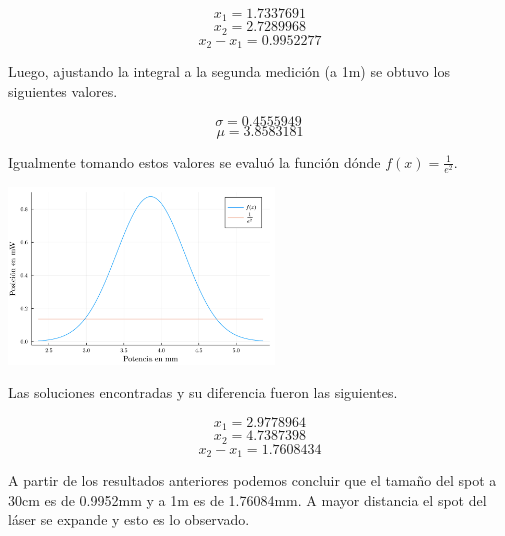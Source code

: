 \documentclass[twocolumn]{article}
\begin{document}
		$$
		x_1=1.7337691
		$$
		$$
		x_2=2.7289968
		$$
		$$
		x_2 - x_1 = 0.9952277
		$$

		Luego, ajustando la integral a la segunda medición (a 1m) se obtuvo los siguientes valores.

		$$
		\sigma = 0.4555949 \
		$$
		$$
		\mu = 3.8583181
		$$

		Igualmente tomando estos valores se evaluó la función dónde $f(x) = \frac{1}{e^2}$.

		\begin{center}
			\includegraphics[width=200pt]{img/normal_2.pdf}
		\end{center}

		Las soluciones encontradas y su diferencia fueron las siguientes.

		$$
		x_1=2.9778964
		$$
		$$
		x_2=4.7387398
		$$
		$$
		x_2 - x_1 = 1.7608434
		$$

		A partir de los resultados anteriores podemos concluir que el tamaño del spot a 30cm es de 0.9952mm y a 1m es de 1.76084mm. A mayor distancia el spot del láser se expande y esto es lo observado.
\end{document}
